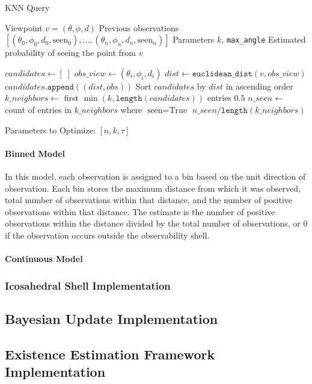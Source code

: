 \begin{singlespace}
    \begin{algorithm}[H]
        \caption{KNN Query}
        \label{alg:query}
        \begin{algorithmic}
            \Require Viewpoint $v = (\theta, \phi, d)$
            \Require Previous observations $[(\theta_0, \phi_0, d_0, \text{seen}_0),\dots,(\theta_n, \phi_n, d_n, \text{seen}_n)]$
            \Require Parameters $k$, \texttt{max\_angle}
            \Ensure Estimated probability of seeing the point from $v$

            \State $candidates \gets [\;]$
            \State $obs\_view \gets (\theta_i, \phi_i, d_i)$
            \State $dist \gets \texttt{euclidean\_dist}(v, obs\_view)$
            \State $candidates.\texttt{append}((dist, obs))$
            \EndIf
            \EndFor
            \State Sort $candidates$ by $dist$ in ascending order
            \State $k\_neighbors \gets$ first $\min(k, \texttt{length}(candidates))$ entries
            \State \Return $0.5$
            \EndIf
            \State $n\_seen \gets$ count of entries in $k\_neighbors$ where $\text{seen} = \text{True}$
            \State \Return $n\_seen / \texttt{length}(k\_neighbors)$
        \end{algorithmic}
    \end{algorithm}
\end{singlespace}

Parameters to Optimize: $[n, k, \tau]$

\paragraph{Binned Model}

In this model, each observation is assigned to a bin based on the unit direction of observation. Each bin stores the maximum distance from which it was observed, total number of observations within that distance, and the number of positive observations within that distance. The estimate is the number of positive observations within the distance divided by the total number of observations, or 0 if the observation occurs outside the observability shell.

\paragraph{Continuous Model}

\subsubsection{Icosahedral Shell Implementation}
\label{sec:icos_construction}

\subsection{Bayesian Update Implementation}

\subsection{Existence Estimation Framework Implementation}